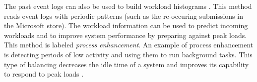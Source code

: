 The past event logs can also be used to build workload histograms \cite{getta2014mining}.
This method reads event logs with periodic patterns (such as the re-occuring submissions in the Microsoft store).
The workload information can be used to predict incoming workloads and to improve system performance by preparing against peak loads.
This method is labeled \textit{process enhancement}. 
An example of process enhancement is detecting periods of low activity and using them to run background tasks.
This type of balancing decreases the idle time of a system and improves its capability to respond to peak loads \cite{getta2014mining}.

